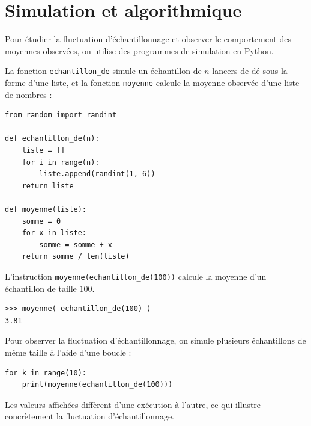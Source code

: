 \newpage

\section{Simulation et algorithmique}

Pour étudier la fluctuation d'échantillonnage et observer le comportement des moyennes observées, on utilise des programmes de simulation en Python.

\begin{ex}
	La fonction \texttt{echantillon\_de} simule un échantillon de $n$ lancers de dé sous la forme d'une liste, et la fonction \texttt{moyenne} calcule la moyenne observée d'une liste de nombres :

	\begin{lstlisting}
from random import randint

def echantillon_de(n):
    liste = []
    for i in range(n):
        liste.append(randint(1, 6))
    return liste

def moyenne(liste):
    somme = 0
    for x in liste:
        somme = somme + x
    return somme / len(liste)
\end{lstlisting}

	L'instruction \texttt{moyenne(echantillon\_de(100))} calcule la moyenne d'un échantillon de taille $100$.
	\begin{lstlisting}
>>> moyenne( echantillon_de(100) )
3.81
\end{lstlisting}

\end{ex}

\begin{rem}
	Pour observer la fluctuation d'échantillonnage, on simule plusieurs échantillons de même taille à l'aide d'une boucle :

	\begin{lstlisting}
for k in range(10):
    print(moyenne(echantillon_de(100)))
\end{lstlisting}

	Les valeurs affichées diffèrent d'une exécution à l'autre, ce qui illustre concrètement la fluctuation d'échantillonnage.
\end{rem}

